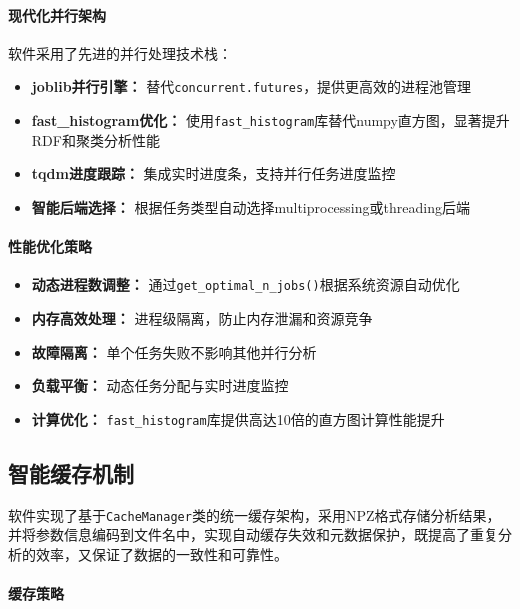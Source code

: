 \paragraph{现代化并行架构}

软件采用了先进的并行处理技术栈：

\begin{itemize}
    \item \textbf{joblib并行引擎：} 替代\lstinline|concurrent.futures|，提供更高效的进程池管理
    \item \textbf{fast\_histogram优化：} 使用\lstinline|fast_histogram|库替代numpy直方图，显著提升RDF和聚类分析性能
    \item \textbf{tqdm进度跟踪：} 集成实时进度条，支持并行任务进度监控
    \item \textbf{智能后端选择：} 根据任务类型自动选择multiprocessing或threading后端
\end{itemize}

\paragraph{性能优化策略}

\begin{itemize}
    \item \textbf{动态进程数调整：} 通过\lstinline|get_optimal_n_jobs()|根据系统资源自动优化
    \item \textbf{内存高效处理：} 进程级隔离，防止内存泄漏和资源竞争
    \item \textbf{故障隔离：} 单个任务失败不影响其他并行分析
    \item \textbf{负载平衡：} 动态任务分配与实时进度监控
    \item \textbf{计算优化：} \lstinline|fast_histogram|库提供高达10倍的直方图计算性能提升
\end{itemize}

\subsection{智能缓存机制}
\label{subsec:intelligent_caching}

软件实现了基于\lstinline|CacheManager|类的统一缓存架构，采用NPZ格式存储分析结果，并将参数信息编码到文件名中，实现自动缓存失效和元数据保护，既提高了重复分析的效率，又保证了数据的一致性和可靠性。

\paragraph{缓存策略}

